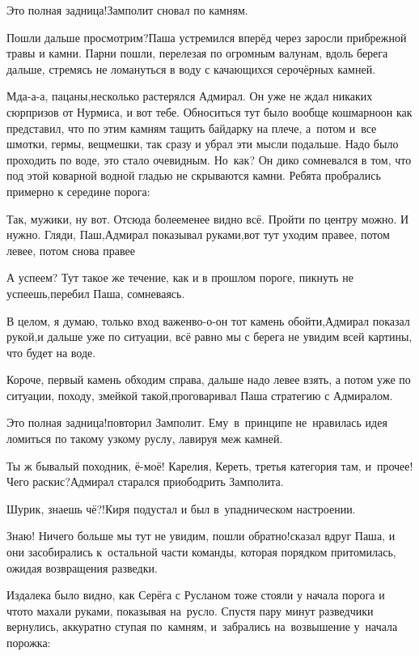 \diagdash Это полная задница!\mdash Замполит сновал по камням.

\diagdash Пошли дальше просмотрим?\mdash Паша устремился вперёд через заросли прибрежной травы и камни. Парни пошли, перелезая по огромным валунам, вдоль берега дальше, стремясь не ломануться в воду с качающихся серо\sdash чёрных камней.

\diagdash Мда-а-а, пацаны,\mdash несколько растерялся Адмирал. Он уже не ждал никаких сюрпризов от Нурмиса, и вот тебе. Обноситься тут было вообще кошмарно\mdash он как представил, что по этим камням тащить байдарку на плече, а~потом и~все шмотки, гермы, вещмешки, так сразу и убрал эти мысли подальше. Надо было проходить по воде, это стало очевидным. Но~как? Он дико сомневался в том, что под этой коварной водной гладью не скрываются камни. Ребята пробрались примерно к середине порога:

\diagdash Так, мужики, ну вот. Отсюда более\sdash менее видно всё. Пройти по центру можно. И нужно. Гляди, Паш,\mdash Адмирал показывал руками,\mdash вот тут уходим правее, потом левее, потом снова правее\myldots{}

\diagdash А успеем? Тут такое же течение, как и в прошлом пороге, пикнуть не успеешь,\mdash перебил Паша, сомневаясь.

\diagdash В целом, я думаю, только вход важен\mdash во-о-он тот камень обойти,\mdash Адмирал показал рукой,\mdash и дальше уже по ситуации, всё равно мы с берега не увидим всей картины, что будет на воде.

\diagdash Короче, первый камень обходим справа, дальше надо левее взять, а потом уже по ситуации, походу, змейкой такой,\mdash проговаривал Паша стратегию с Адмиралом. 

\diagdash Это полная задница!\mdash повторил Замполит. Ему~в~принципе не~нравилась идея ломиться по такому узкому руслу, лавируя меж камней.

\diagdash Ты ж бывалый походник, ё-моё! Карелия, Кереть, третья категория там, и~прочее! Чего раскис?\mdash Адмирал старался приободрить Замполита.

\diagdash Шурик, знаешь чё?!\mdash Киря подустал и был в~упадническом настроении.

\diagdash Знаю! Ничего больше мы тут не увидим, пошли обратно!\mdash сказал вдруг Паша, и они засобирались к~остальной части команды, которая порядком притомилась, ожидая возвращения разведки. 

Издалека было видно, как Серёга с Русланом тоже стояли у начала порога и что\sdash то махали руками, показывая на~русло. Спустя пару минут разведчики вернулись, аккуратно ступая по~камням, и~забрались на~возвышение у~начала порожка:

